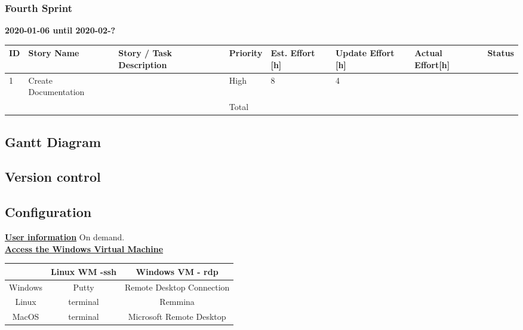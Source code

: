 \documentclass{scrartcl}
\begin{document}
\subsubsection{Fourth Sprint}
\textbf{2020-01-06 until 2020-02-?}
\begin{table}[]
  \begin{tabular}{l|l|l|l|l|l|l|l}
  ID                     & Story Name & Story / Task Description & Priority & Est. Effort {[}h{]} & Update Effort {[}h{]} & Actual Effort{[}h{]} & Status                \\ \hline
  \multicolumn{1}{|l|}{1} & Create Documentation &  & High & 8 & 4 &  & \multicolumn{1}{l|}{} \\ \hline
  \multicolumn{1}{|l|}{} &  &  & Total &  &  &  & \multicolumn{1}{l|}{} \\ \hline
\end{tabular}
\end{table}

\subsection{Gantt Diagram}


\subsection{Version control}

\subsection{Configuration}

\textbf{\underline{User information}}
On demand.\\

\textbf{\underline{Access the Windows Virtual Machine}}
\begin{center}
  \begin{tabular}{|c|c|c|}
    \hline
     & Linux WM -ssh & Windows VM - rdp \\
    \hline
    Windows & Putty & Remote Desktop Connection \\
    \hline
    Linux & terminal & Remmina \\
    \hline
    MacOS & terminal & Microsoft Remote Desktop \\
    \hline
  \end{tabular}
\end{center}
\end{document}
